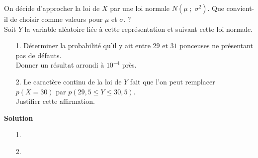 On décide d'approcher la loi de $X$ par une loi normale $N\left(\mu \; ; \; \sigma^2\right)$. Que convient-il de choisir comme valeurs pour $\mu$ et $\sigma$. ? \\

Soit $Y$ la variable aléatoire liée à cette représentation et suivant cette loi normale. \\

\begin{itemize}
\item[1.] Déterminer la probabilité qu'il y ait entre $29$ et $31$ ponceuses ne présentant pas de défauts. \\ Donner un résultat arrondi à $10^{-4}$ près. \\
\item[2.] Le caractère continu de la loi de $Y$ fait que l'on peut remplacer $p\left(X = 30\right)$ par $p\left(29,5 \leqslant Y \leqslant 30,5\right)$. \\
Justifier cette affirmation.
\end{itemize}

\vspace*{.3cm}

\textbf{Solution} \\

\begin{itemize}
\item[1.]
\item[2.]
\end{itemize}